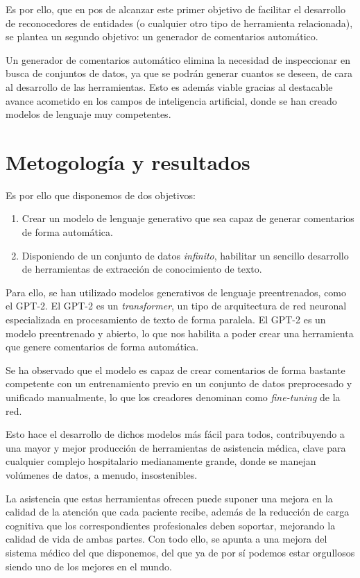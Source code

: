 Es por ello, que en pos de alcanzar este primer objetivo de facilitar el desarrollo de reconocedores de entidades (o cualquier otro tipo de herramienta relacionada), se plantea un segundo objetivo: un generador de comentarios automático.

Un generador de comentarios automático elimina la necesidad de inspeccionar en busca de conjuntos de datos, ya que se podrán generar cuantos se deseen, de cara al desarrollo de las herramientas. Esto es además viable gracias al destacable avance acometido en los campos de inteligencia artificial, donde se han creado modelos de lenguaje muy competentes.


\section{Metogología y resultados}
Es por ello que disponemos de dos objetivos: 
\begin{enumerate}
	\item Crear un modelo de lenguaje generativo que sea capaz de generar comentarios de forma automática.
	\item Disponiendo de un conjunto de datos \textit{infinito}, habilitar un sencillo desarrollo de herramientas de extracción de conocimiento de texto.
\end{enumerate}

Para ello, se han utilizado modelos generativos de lenguaje preentrenados, como el GPT-2. El GPT-2 es un \textit{transformer}, un tipo de arquitectura de red neuronal especializada en procesamiento de texto de forma paralela. El GPT-2 es un modelo preentrenado y abierto, lo que nos habilita a poder crear una herramienta que genere comentarios de forma automática.

Se ha observado que el modelo es capaz de crear comentarios de forma bastante competente con un entrenamiento previo en un conjunto de datos preprocesado y unificado manualmente, lo que los creadores denominan como \textit{fine-tuning} de la red. 

Esto hace el desarrollo de dichos modelos más fácil para todos, contribuyendo a una mayor y mejor producción de herramientas de asistencia médica, clave para cualquier complejo hospitalario medianamente grande, donde se manejan volúmenes de datos, a menudo, insostenibles.

La asistencia que estas herramientas ofrecen puede suponer una mejora en la calidad de la atención que cada paciente recibe, además de la reducción de carga cognitiva que los correspondientes profesionales deben soportar, mejorando la calidad de vida de ambas partes. Con todo ello, se apunta a una mejora del sistema médico del que disponemos, del que ya de por sí podemos estar orgullosos siendo uno de los mejores en el mundo.

